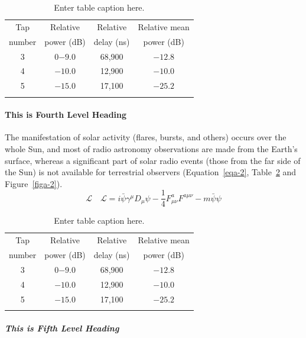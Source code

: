 \begin{table}
\caption{Enter table caption here.\label{taba-1}}{%
\begin{tabular}{@{}cccc@{}}
\toprule
Tap     &Relative   &Relative   &Relative mean\\
number  &power (dB) &delay (ns) &power (dB)\\
\midrule
3 &0$-9.0$  &68,900\footnotemark[1] &$-12.8$\\
4 &$-10.0$ &12,900\footnotemark[2] &$-10.0$\\
5 &$-15.0$ &17,100 &$-25.2$\\
\botrule
\end{tabular}}{
}
\end{table}

\paragraph{This is Fourth Level Heading}
\lipsum[5]

The manifestation of solar activity (flares, bursts, and others) occurs over the whole Sun, and most of radio astronomy observations are made from the Earth's surface, whereas a significant part of solar radio events (those from the far side of the Sun) is not available for terrestrial observers (Equation~\ref{eqa-2}, Table~\ref{taba-2} and Figure~\ref{figa-2}).
\begin{equation}
\mathcal{L}\quad \mathbf{\mathcal{L}} = i \bar{\psi} \gamma^\mu D_\mu \psi - 
\frac{1}{4} F_{\mu\nu}^a F^{a\mu\nu} - m \bar{\psi} \psi\label{eqa-2}
\end{equation}

\begin{table}
\caption{Enter table caption here.\label{taba-2}}{%
\begin{tabular}{@{}cccc@{}}
\toprule
Tap     &Relative   &Relative   &Relative mean\\
number  &power (dB) &delay (ns) &power (dB)\\
\midrule
3 &0$-9.0$  &68,900\footnotemark[1] &$-12.8$\\
4 &$-10.0$ &12,900\footnotemark[2] &$-10.0$\\
5 &$-15.0$ &17,100 &$-25.2$\\
\botrule
\end{tabular}}{
}
\end{table}

\subparagraph{This is Fifth Level Heading}
\lipsum[6]

\egroup

